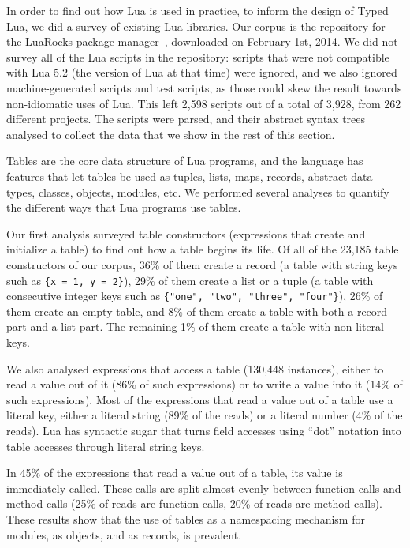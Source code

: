 \documentclass[preprint]{sigplanconf}
\begin{document}
In order to find out how Lua is used in practice, to inform
the design of Typed Lua, we did a survey of existing Lua
libraries. Our corpus is the repository for the LuaRocks
package manager~\cite{hisham2013luarocks}, downloaded on
February 1st, 2014. We did not survey all of the Lua
scripts in the repository: scripts that were not compatible
with Lua 5.2 (the version of Lua at that time) were ignored,
and we also ignored machine-generated scripts and test scripts,
as those could skew the result towards non-idiomatic uses
of Lua. This left 2,598 scripts out of a total of 3,928, from
262 different projects. The scripts were parsed, and their
abstract syntax trees analysed to collect the data that we
show in the rest of this section.

Tables are the core data structure of Lua programs, and
the language has features that let tables be used as
tuples, lists, maps, records, abstract data types, classes,
objects, modules, etc. We performed several analyses to
quantify the different ways that Lua programs use tables.

Our first analysis surveyed table constructors (expressions
that create and initialize a table) to find out how a table
begins its life. Of all of the 23,185 table constructors of
our corpus, 36\% of them create a record (a table with string
keys such as \texttt{\{x = 1, y = 2\}}), 29\% of them create
a list or a tuple (a table with consecutive integer keys such as \texttt{\{"one", "two", "three", "four"\}}), 26\% of them create an empty table, and 8\% of them create a table with
both a record part and a list part. The remaining 1\% of them create a table with non-literal keys.

We also analysed expressions that access a table (130,448 instances), either to read a value out of it (86\% of such expressions) or to write a 
value into it (14\% of such expressions). Most of the expressions
that read a value out of a table use a literal key,
either a literal string (89\% of the reads) or a literal
number (4\% of the reads). Lua has syntactic sugar that
turns field accesses using ``dot'' notation into table
accesses through literal string keys.

In 45\% of the expressions that read a value out of a table,
its value is immediately called. These calls are split almost
evenly between function calls and method calls (25\% of reads
are function calls, 20\% of reads are method calls).
These results show that the use of tables as a namespacing
mechanism for modules, as objects, and as records, 
is prevalent.
\end{document}
